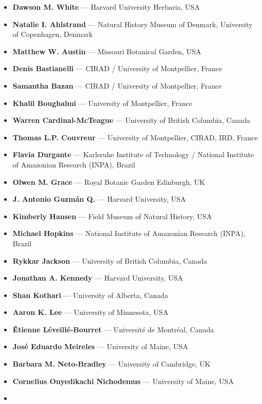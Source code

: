 \documentclass[
  letterpaper,
  DIV=11,
  numbers=noendperiod]{scrreprt}
\providecommand{\tightlist}{%
  \setlength{\itemsep}{0pt}\setlength{\parskip}{0pt}}
\begin{document}
\begin{itemize}
\tightlist
\item
  \textbf{Dawson M. White} --- Harvard University Herbaria, USA
\item
  \textbf{Natalie I. Ahlstrand} --- Natural History Museum of Denmark,
  University of Copenhagen, Denmark
\item
  \textbf{Matthew W. Austin} --- Missouri Botanical Garden, USA
\item
  \textbf{Denis Bastianelli} --- CIRAD / University of Montpellier,
  France
\item
  \textbf{Samantha Bazan} --- CIRAD / University of Montpellier, France
\item
  \textbf{Khalil Boughalmi} --- University of Montpellier, France
\item
  \textbf{Warren Cardinal-McTeague} --- University of British Columbia,
  Canada
\item
  \textbf{Thomas L.P. Couvreur} --- University of Montpellier, CIRAD,
  IRD, France
\item
  \textbf{Flavia Durgante} --- Karlsruhe Institute of Technology /
  National Institute of Amazonian Research (INPA), Brazil
\item
  \textbf{Olwen M. Grace} --- Royal Botanic Garden Edinburgh, UK
\item
  \textbf{J. Antonio Guzmán Q.} --- Harvard University, USA
\item
  \textbf{Kimberly Hansen} --- Field Museum of Natural History, USA
\item
  \textbf{Michael Hopkins} --- National Institute of Amazonian Research
  (INPA), Brazil
\item
  \textbf{Rykkar Jackson} --- University of British Columbia, Canada
\item
  \textbf{Jonathan A. Kennedy} --- Harvard University, USA
\item
  \textbf{Shan Kothari} --- University of Alberta, Canada
\item
  \textbf{Aaron K. Lee} --- University of Minnesota, USA
\item
  \textbf{Étienne Léveillé-Bourret} --- Université de Montréal, Canada
\item
  \textbf{José Eduardo Meireles} --- University of Maine, USA
\item
  \textbf{Barbara M. Neto-Bradley} --- University of Cambridge, UK
\item
  \textbf{Cornelius Onyedikachi Nichodemus} --- University of Maine, USA
\item

\end{itemize}
\end{document}
